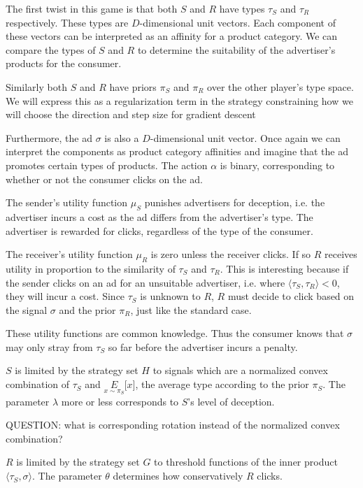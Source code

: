 \documentclass{article}
\begin{document}
\noindent The first twist in this game is that both $S$ and $R$ have types $\tau_S$ and $\tau_R$ respectively. These types are $D$-dimensional unit vectors. Each component of these vectors can be interpreted as an affinity for a product category. We can compare the types of $S$ and $R$ to determine the suitability of the advertiser's products for the consumer. 

Similarly both $S$ and $R$ have priors $\pi_S$ and $\pi_R$ over the other player's type space. We will express this as a regularization term in the strategy constraining how we will choose the direction and step size for gradient descent

Furthermore, the ad $\sigma$ is also a $D$-dimensional unit vector. Once again we can interpret the components as product category affinities and imagine that the ad promotes certain types of products. The action $\alpha$ is binary, corresponding to whether or not the consumer clicks on the ad.

The sender's utility function $\mu_S$ punishes advertisers for deception, i.e. the advertiser incurs a cost as the ad differs from the advertiser's type. The advertiser is rewarded for clicks, regardless of the type of the consumer.

The receiver's utility function $\mu_R$ is zero unless the receiver clicks. If so $R$ receives utility in proportion to the similarity of $\tau_S$ and $\tau_R$. This is interesting because if the sender clicks on an ad for an unsuitable advertiser, i.e. where $\langle \tau_S, \tau_R \rangle < 0$, they will incur a cost. Since $\tau_S$ is unknown to $R$, $R$ must decide to click based on the signal $\sigma$ and the prior $\pi_R$, just like the standard case.

These utility functions are common knowledge. Thus the consumer knows that $\sigma$ may only stray from $\tau_S$ so far before the advertiser incurs a penalty.

$S$ is limited by the strategy set $H$ to signals which are a normalized convex combination of $\tau_S$ and $\underset{x\sim\pi_S}{E}\lbrack x \rbrack$, the average type according to the prior $\pi_S$. The parameter $\lambda$ more or less corresponds to $S$'s level of deception.

QUESTION: what is corresponding rotation instead of the normalized convex combination?

$R$ is limited by the strategy set $G$ to threshold functions of the inner product $\langle \tau_S, \sigma \rangle$. The parameter $\theta$ determines how conservatively $R$ clicks.
\end{document}
